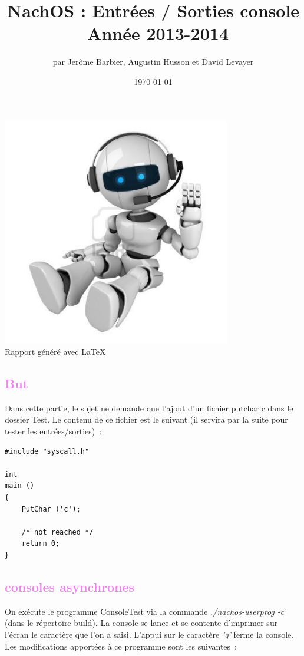 \documentclass[a4paper,10pt]{article}
\title{NachOS : Entrées / Sorties console \\ Année 2013-2014}
\author{par Jerôme Barbier, Augustin Husson et David Levayer}
\date{\today}
\begin{document}
    \maketitle

  \begin{center}
    \includegraphics[width=10cm,height=10cm]{../partie3/robottrading.jpg}\\
    Rapport généré avec \LaTeX
  \end{center}
  \tableofcontents
  \newpage
  \textcolor{Violet}{\section{But}}
  Dans cette partie, le sujet ne demande que l'ajout d'un fichier putchar.c dans le dossier Test. 
  Le contenu de ce fichier est le suivant (il servira par la suite pour tester les entrées/sorties) :
  \begin{lstlisting}
#include "syscall.h"

int
main ()
{
    PutChar ('c');

    /* not reached */
    return 0;
}   
  \end{lstlisting}
 \textcolor{Violet}{\section{consoles asynchrones}}
 On exécute le programme ConsoleTest via la commande \emph{./nachos-userprog -c} (dans le répertoire build). 
 La console se lance et se contente d'imprimer sur l'écran le caractère que l'on a saisi. L'appui sur le caractère \emph{'q'} ferme la console.
 Les modifications apportées à ce programme sont les suivantes :
\end{document}
